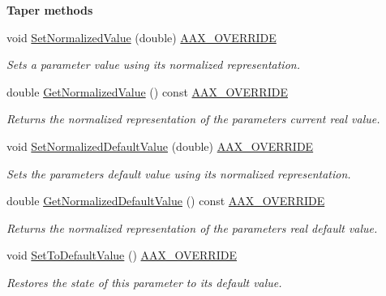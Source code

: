 \begin{Indent}\textbf{ Taper methods}\par
\begin{DoxyCompactItemize}
\item 
void \mbox{\hyperlink{a01541_a921a21bd3a68cdcf6c9d5903f3d18dd6}{Set\+Normalized\+Value}} (double) \mbox{\hyperlink{a00392_ac2f24a5172689ae684344abdcce55463}{A\+A\+X\+\_\+\+O\+V\+E\+R\+R\+I\+DE}}
\begin{DoxyCompactList}\small\item\em Sets a parameter value using it\textquotesingle{}s normalized representation. \end{DoxyCompactList}\item 
double \mbox{\hyperlink{a01541_a24ae82197c173012d1f2b10c6b3456d0}{Get\+Normalized\+Value}} () const \mbox{\hyperlink{a00392_ac2f24a5172689ae684344abdcce55463}{A\+A\+X\+\_\+\+O\+V\+E\+R\+R\+I\+DE}}
\begin{DoxyCompactList}\small\item\em Returns the normalized representation of the parameter\textquotesingle{}s current real value. \end{DoxyCompactList}\item 
void \mbox{\hyperlink{a01541_a94043d4e33cf8560e3bd22e6503980d3}{Set\+Normalized\+Default\+Value}} (double) \mbox{\hyperlink{a00392_ac2f24a5172689ae684344abdcce55463}{A\+A\+X\+\_\+\+O\+V\+E\+R\+R\+I\+DE}}
\begin{DoxyCompactList}\small\item\em Sets the parameter\textquotesingle{}s default value using its normalized representation. \end{DoxyCompactList}\item 
double \mbox{\hyperlink{a01541_a1b7fd3909bedaf90b33f6db681add351}{Get\+Normalized\+Default\+Value}} () const \mbox{\hyperlink{a00392_ac2f24a5172689ae684344abdcce55463}{A\+A\+X\+\_\+\+O\+V\+E\+R\+R\+I\+DE}}
\begin{DoxyCompactList}\small\item\em Returns the normalized representation of the parameter\textquotesingle{}s real default value. \end{DoxyCompactList}\item 
void \mbox{\hyperlink{a01541_a94266dd40a437b425a88b5a4d848bad3}{Set\+To\+Default\+Value}} () \mbox{\hyperlink{a00392_ac2f24a5172689ae684344abdcce55463}{A\+A\+X\+\_\+\+O\+V\+E\+R\+R\+I\+DE}}
\begin{DoxyCompactList}\small\item\em Restores the state of this parameter to its default value. \end{DoxyCompactList}\item 

\end{DoxyCompactItemize}
\end{Indent}
